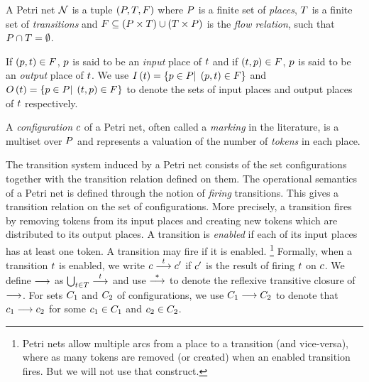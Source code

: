 \label{section:model}

A Petri net ${\mathcal N}$ is a tuple $\left(P,T,F\right)$ 
where $P$ is a finite set of \emph{places},
$T$ is a finite set of \emph{transitions}
and $F\subseteq(P\times T)\cup(T\times P)$
is the \emph{flow relation}, such that $P\cap T=\emptyset$.

%
If $\left(p,t\right)\in F$, $p$ is said to
be an \emph{input} place of $t$ and if
$\left(t,p\right)\in F$, $p$ is said to be
an \emph{output} place of $t$.
%
We use $I\left(t\right)=\left\{p\in P|\;\left(p,t\right)\in F\right\}$ and
$O\left(t\right)=\left\{p\in P|\;\left(t,p\right)\in F\right\}$ to denote the sets of input places and
output places of $t$ respectively.

%
A \emph{configuration} $c$ of a Petri net, often called a
\emph{marking} in the literature, is a multiset over $P$ and
represents a valuation of %
the number of \emph{tokens} in each place.
%

%
The transition system induced by a Petri net consists of the set
configurations together with the transition relation defined on them.
%
The operational semantics of a Petri net is defined through the notion
of \emph{firing} transitions. This gives a transition relation on the
set of configurations.
%
More precisely, a transition fires by removing tokens from its input
places and creating new tokens which are distributed to its output
places. A transition is \emph{enabled} if each of its input places has
at least one token. A transition may fire if it is
enabled. \footnote{Petri nets allow multiple arcs from a place to a
  transition (and vice-versa), where as many tokens are removed (or
  created) when an enabled transition fires. But we will not use that
  construct.}%
%
Formally, when a transition $t$ is enabled, we write
$c\stackrel{t}{\longrightarrow}c'$ if $c'$ is the result of
firing $t$ on $c$.
%
We define $\stackrel{}{\longrightarrow}$ as
$\bigcup_{t\in T}\stackrel{t}{\longrightarrow}$ and
use $\stackrel{*}{\longrightarrow}$ to denote the reflexive transitive closure of
$\stackrel{}{\longrightarrow}$.
%
For sets $C_1$ and $C_2$ of configurations, 
we use $C_1\stackrel{}{\longrightarrow}C_2$ to denote that
$c_1\stackrel{}{\longrightarrow}c_2$ for some $c_1\in C_1$ and $c_2\in C_2$.
%


